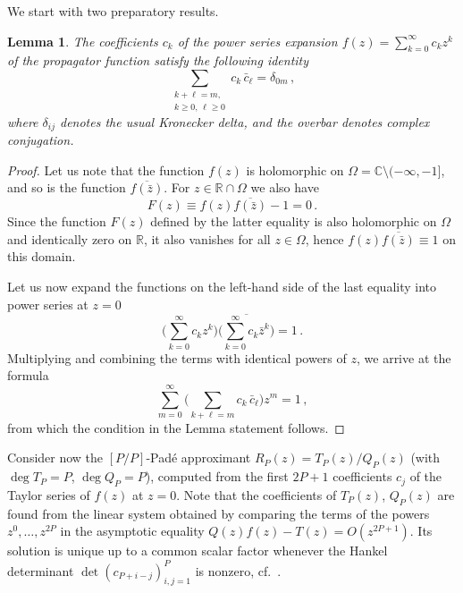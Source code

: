 \documentclass[11pt,a4paper]{article}
\theoremstyle{plain}%
\newtheorem{lemma}[thm]{Lemma}
\theoremstyle{definition}
\theoremstyle{remark}
\begin{document}
We start with two preparatory results.
\begin{lemma}\label{lem:31} 
The coefficients $c_k$ of the power series expansion $f(z) = \sum_{k=0}^{\infty}c_k z^k$ of the propagator function satisfy the following identity
    \begin{equation}\label{Tay_coeffs}
        \sum_{\substack{k+\ell = m,\\
        k\ge0,\, \ell\ge0}}
        c_k \,\bar{c}_{\ell} = \delta_{0m}\,,
    \end{equation}
where $\delta_{ij}$ denotes the usual Kronecker delta, and the overbar denotes complex conjugation.
\end{lemma}
\begin{proof}
    Let us note that the function $f(z)$ is holomorphic on $\Omega = \mathbb{C}\setminus (-\infty, -1]$,
    and so is the function $\overline{f(\bar{z})}$.
    For $z\in \mathbb{R}\cap \Omega$ we also have 
    \begin{equation*} 
        F(z) \equiv f(z) \overline{f(\bar{z})} - 1 = 0\,. 
    \end{equation*}
    Since the function $F(z)$ defined by the latter equality is also holomorphic on $\Omega$ and identically zero on $\mathbb{R}$, it also vanishes for all $z\in \Omega$, hence $f(z)\overline{f(\bar{z})} \equiv 1$ on this domain.
    
    Let us now expand the functions on the left-hand side of the last equality into power series at $z=0$
    \begin{equation*}
    \biggl(\sum_{k=0}^{\infty} c_k z^k\biggr)
    \overline{\biggl(\sum_{k=0}^{\infty} c_k \bar{z}^{k} \biggr)} = 1\,. 
    \end{equation*}
    Multiplying and combining the terms with identical powers of $z$, we arrive at the formula
    \begin{equation*} 
    \sum_{m=0}^{\infty}\biggl(\sum_{k+\ell =m} c_k \,
    \bar{c}_{\ell} \biggr)z^m = 1\,, 
    \end{equation*}
    from which the condition in the Lemma statement follows.
\end{proof}

Consider now the $[P/P]$-Pad\'e approximant $R_P(z) = T_P(z)/Q_P(z)$ (with $\deg T_P = P$, $\deg Q_P = P$), 
computed from the first $2P+1$ coefficients $c_j$ of the Taylor series of $f(z)$ at $z=0$. 
%
Note that the coefficients of $T_P(z)$, $Q_P(z)$ are found from the linear system obtained by comparing the terms of the powers $z^0,\dots,z^{2P}$ in the asymptotic equality
$Q(z)f(z)-T(z)=O(z^{2P+1})$. 
Its solution is unique up to a common scalar factor whenever the Hankel determinant
$\det(c_{P+i-j})_{i,j=1}^{P}$ is nonzero, cf.\ \cite{Baker1996}.
\end{document}
